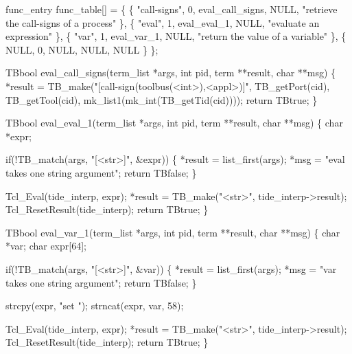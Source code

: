 func_entry func_table[] =
\{ \{ "call-signs", 0, eval_call_signs, NULL, "retrieve the call-signs of a process" \},
  \{ "eval", 1, eval_eval_1, NULL, "evaluate an expression" \},
  \{ "var", 1, eval_var_1, NULL, "return the value of a variable" \},
  \{ NULL, 0, NULL, NULL, NULL \}
\};
\nwendcode{}\nwdocspar

\nwenddocs{}\endmoddef\let\nwnotused=\nwoutput{}
TBbool eval_call_signs(term_list *args, int pid, term **result, char **msg)
\{
  *result = TB_make("[call-sign(toolbus(<int>),<appl>)]", TB_getPort(cid),
                TB_getTool(cid), mk_list1(mk_int(TB_getTid(cid))));
  return TBtrue;  
\}
\nwendcode{}\nwdocspar

\nwenddocs{}\endmoddef\let\nwnotused=\nwoutput{}
TBbool eval_eval_1(term_list *args, int pid, term **result, char **msg)
\{
  char *expr;

  if(!TB_match(args, "[<str>]", &expr)) \{
    *result = list_first(args);
    *msg = "eval takes one string argument";
    return TBfalse;
  \}

  Tcl_Eval(tide_interp, expr);
  *result = TB_make("<str>", tide_interp->result);
  Tcl_ResetResult(tide_interp);
  return TBtrue;
\}
\nwendcode{}\nwdocspar

\nwenddocs{}\endmoddef\let\nwnotused=\nwoutput{}
TBbool eval_var_1(term_list *args, int pid, term **result, char **msg)
\{
  char *var;
  char expr[64];

  if(!TB_match(args, "[<str>]", &var)) \{
    *result = list_first(args);
    *msg = "var takes one string argument";
    return TBfalse;
  \}

  strcpy(expr, "set ");
  strncat(expr, var, 58);

  Tcl_Eval(tide_interp, expr);
  *result = TB_make("<str>", tide_interp->result);
  Tcl_ResetResult(tide_interp);
  return TBtrue;
\}
\nwendcode{}\nwdocspar

